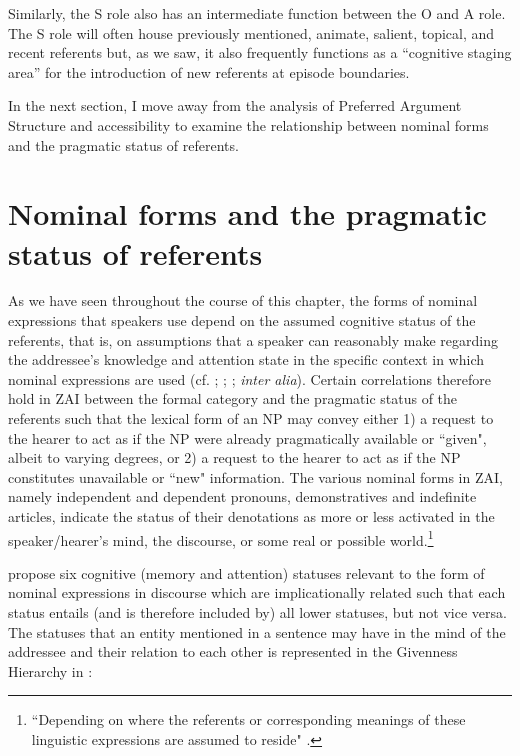 Similarly, the S role also has an intermediate function between the O and A role. The S role will often house previously mentioned, animate, salient, topical, and recent referents but, as we saw, it also frequently functions as a ``cognitive staging area'' for the introduction of new referents at episode boundaries.

In the next section, I move away from the analysis of Preferred Argument Structure and accessibility to examine the relationship between nominal forms and the pragmatic status of referents.


\section{Nominal forms and the pragmatic status of referents}\label{nomforms}

As we have seen throughout the course of this chapter, the forms of nominal expressions that speakers use depend on the assumed cognitive status of the referents, that is, on assumptions that a speaker can reasonably make regarding the addressee's knowledge and attention state in the specific context in which nominal expressions are used (cf. \citealt{chafe1976}; \citealt{prince1981}; \citealt{ariel1988}; \textit{inter alia}). Certain correlations therefore hold in ZAI between the formal category and the pragmatic status of the referents such that the lexical form of an NP may convey either 1) a request to the hearer to act as if the NP were already pragmatically available or ``given", albeit  to varying degrees, or 2) a request to the hearer to act as if the NP constitutes unavailable or ``new" information. The various nominal forms in ZAI, namely independent and dependent pronouns, demonstratives and indefinite articles, indicate the status of their denotations as more or less activated in the speaker/hearer's mind, the discourse, or some real or possible world.\footnote{``Depending on where the referents or corresponding meanings of these linguistic expressions are assumed to reside" \citep[177]{gundel2001}.} 

\citet{gundel1993} propose six cognitive (memory and attention) statuses relevant to the form of nominal expressions in discourse which are implicationally related such that each status entails (and is therefore included by) all lower statuses, but not vice versa. The statuses that an entity mentioned in a sentence may have in the mind of the addressee and their relation to each other is represented in the Givenness Hierarchy in :

